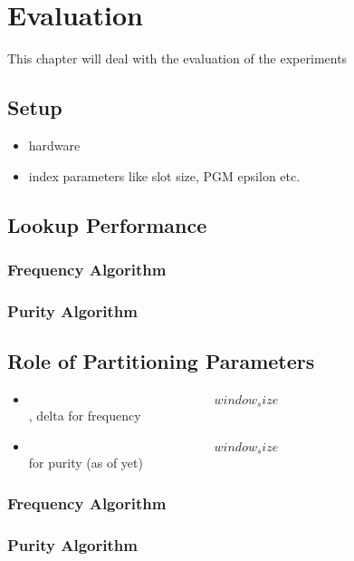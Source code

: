 \thispagestyle{plain}
\chapter{Evaluation}

This chapter will deal with the evaluation of the experiments

\section{Setup}
\begin{itemize}
    \item hardware
    \item index parameters like slot size, PGM epsilon etc.
\end{itemize}
\section{Lookup Performance}

\subsection{Frequency Algorithm}

\subsection{Purity Algorithm}

\section{Role of Partitioning Parameters}
\begin{itemize}
    \item $$window_size$$, delta for frequency
    \item $$window_size$$ for purity (as of yet)
\end{itemize}

\subsection{Frequency Algorithm}

\subsection{Purity Algorithm}